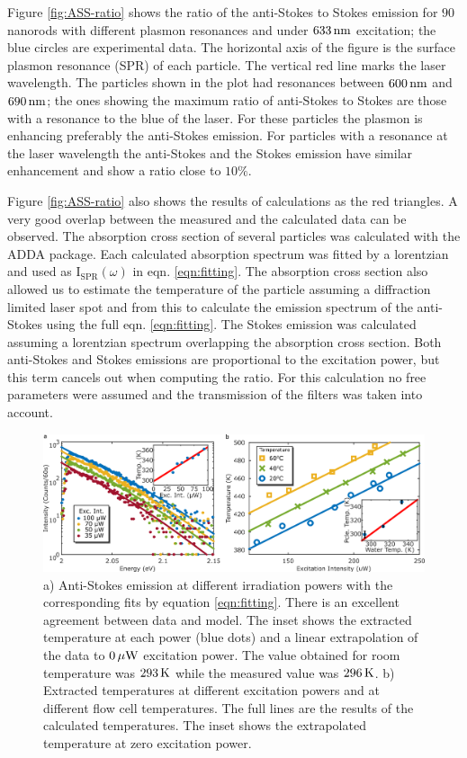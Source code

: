 Figure \ref{fig:ASS-ratio} shows the ratio of the anti-Stokes to Stokes emission
for $90$ nanorods with different plasmon resonances and under $633\,\textrm{nm}$
excitation; the blue circles are experimental data. The horizontal axis of the
figure is the surface plasmon resonance (SPR) of each particle. The vertical red
line marks the laser wavelength. The particles shown in the plot had resonances
between $600\,\textrm{nm}$ and $690\,\textrm{nm}$; the ones showing the maximum ratio of anti-Stokes
to Stokes are those with a resonance to the blue of the laser. For these
particles the plasmon is enhancing preferably the anti-Stokes emission. For
particles with a resonance at the laser wavelength the anti-Stokes and the
Stokes emission have similar enhancement and show a ratio close to $10\%$. 

Figure \ref{fig:ASS-ratio} also shows the results of calculations as the red
triangles. A very good overlap between the measured and the calculated data can
be observed. The absorption cross section of several particles was calculated
with the ADDA package. Each calculated absorption spectrum was fitted by a
lorentzian and used as $\textrm{I}_{\textrm{SPR}}(\omega)$ in eqn.
\ref{eqn:fitting}. The absorption cross section also allowed us to estimate the
temperature of the particle assuming a diffraction limited laser spot and from
this to calculate the emission spectrum of the anti-Stokes using the full eqn.
\ref{eqn:fitting}. The Stokes emission was calculated assuming a lorentzian
spectrum overlapping the absorption cross section. Both anti-Stokes and Stokes
emissions are proportional to the excitation power, but this term cancels out
when computing the ratio. For this calculation no free parameters were assumed
and the transmission of the filters was taken into account.

\begin{figure}[htp] \centering
\includegraphics[width=\textwidth]{Chapters/04_Anti-Stokes/Figures/03_Fit_Of_AS/03_Log_Fit_AS.png}
\caption{a) Anti-Stokes emission at different irradiation powers with the
corresponding fits by equation \ref{eqn:fitting}. There is an excellent
agreement between data and model. The inset shows the extracted
temperature at each power (blue dots) and a linear extrapolation of the data to $0\,\mu\textrm{W}$ excitation power.
The value obtained for room temperature was $293\,\textrm{K}$ while the measured value was
$296\,\textrm{K}$. b) Extracted temperatures at different excitation powers and at
different flow cell temperatures. The full lines are the results of the
calculated temperatures. The inset shows the extrapolated temperature at zero
excitation power.}
	\label{fig:AS_in_Log}
\end{figure}


